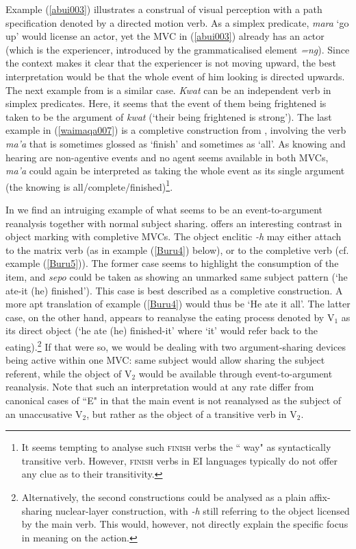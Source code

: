 Example (\ref{abui003}) illustrates a construal of visual perception with a path specification denoted by a directed motion verb. As a simplex predicate, \textit{mara} `go up' would license an actor, yet the MVC in (\ref{abui003}) already has an actor (which is the experiencer, introduced by the grammaticalised element \textit{=ng}). Since the context makes it clear that the experiencer is not moving upward, the best interpretation would be that the whole event of him looking is directed upwards. The next example from  is a similar case. \textit{Kwat} can be an independent verb in simplex predicates. Here, it seems that the event of them being frightened is taken to be the argument of \textit{kwat} (`their being frightened is strong'). The last example in (\ref{waimaqa007}) is a completive construction from , involving the verb \textit{ma'a} that is sometimes glossed as `finish' and sometimes as `all'. As knowing and hearing are non-agentive events and no agent seems available in both MVCs, \textit{ma'a} could again be interpreted as taking the whole event as its single argument (the knowing is all/complete/finished)\footnote{It seems tempting to analyse such \textsc{finish} verbs the `` way" as syntactically transitive verb. However, \textsc{finish} verbs in EI languages typically do not offer any clue as to their transitivity.}.

In  we find an intruiging example of what seems to be an event-to-ar\-gu\-ment reanalysis together with normal subject sharing.  offers an interesting contrast in object marking with completive MVCs. The object enclitic \textit{-h} may either attach to the matrix verb (as in example (\ref{Buru4}) below), or to the completive verb (cf. example (\ref{Buru5})). The former case seems to highlight the consumption of the item, and \textit{sepo} could be taken as showing an unmarked same subject pattern (`he ate-it (he) finished'). This case is best described as a completive construction. A more apt translation of example (\ref{Buru4}) would thus be `He ate it all'. The latter case, on the other hand, appears to reanalyse the eating process denoted by V$_1$ as its direct object (`he ate (he) finished-it' where `it' would refer back to the eating).\footnote{Alternatively, the second constructions could be analysed as a plain affix-sharing nuclear-layer construction, with \textit{-h} still referring to the object licensed by the main verb. This would, however, not directly explain the specific focus in meaning on the action.} If that were so, we would be dealing with two argument-sharing devices being active within one MVC: same subject would allow sharing the subject referent, while the object of V$_2$ would be available through event-to-argument reanalysis. Note that such an interpretation would at any rate differ from canonical cases of ``E" in that the main event is not reanalysed as the subject of an unaccusative V$_2$, but rather as the object of a transitive verb in V$_2$. 

